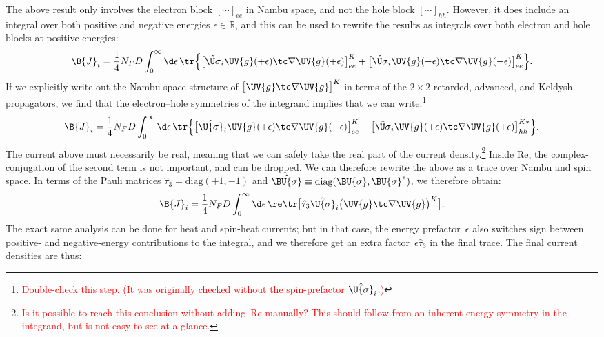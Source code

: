 The above result only involves the electron block $[\cdots]_{ee}$ in Nambu space, and not the hole block $[\cdots]_{hh}$.
However, it does include an integral over both positive and negative energies $\epsilon \in \mathbb{R}$, and this can be used to rewrite the results as integrals over both electron and hole blocks at positive energies:
\begin{align}
  \B{J}_i = \frac{1}{4}N_FD \int_0^\infty \d\epsilon\, \tr \Big\{  \big[\hat{\U\sigma}_i \UV{g}(+\epsilon)\tc\nabla\UV{g}(+\epsilon) \big]^K_{ee} + \big[ \hat{\U\sigma}_i \UV{g}(-\epsilon)\tc\nabla\UV{g}(-\epsilon) \big]^K_{ee} \Big\}.
\end{align}
If we explicitly write out the Nambu-space structure of $\big[ \UV{g}\tc\nabla\UV{g} \big]^K$ in terms of the $2\times2$ retarded, advanced, and Keldysh propagators, we find that the electron--hole symmetries of the integrand implies that we can write:\footnote{\textcolor{red}{Double-check this step. (It was originally checked without the spin-prefactor $\hat{\U{\sigma}}_i$.)}}
\begin{align}
  \B{J}_i = \frac{1}{4}N_FD \int_0^\infty \d\epsilon\, \tr \Big\{ \big[ \hat{\U{\sigma}}_i \UV{g}(+\epsilon)\tc\nabla\UV{g}(+\epsilon) \big]^K_{ee} - \big[ \hat{\U\sigma}_i \UV{g}(+\epsilon)\tc\nabla\UV{g}(+\epsilon) \big]^{K\ast}_{hh} \Big\}.
\end{align}
The current above must necessarily be real, meaning that we can safely take the real part of the current density.\footnote{\textcolor{red}{Is it possible to reach this conclusion without adding~Re manually? This should follow from an inherent energy-symmetry in the integrand, but is not easy to see at a glance.}}
Inside Re, the complex-conjugation of the second term is not important, and can be dropped.
We can therefore rewrite the above as a trace over Nambu and spin space.
In terms of the Pauli matrices $\hat{\tau}_3 = \text{diag}(+1,-1)$ and $\hat{\BU{\sigma}} \equiv \text{diag}(\BU{\sigma},\BU{\sigma}^*)$, we therefore obtain:
\begin{align}
  \B{J}_i = \frac{1}{4}N_FD \int_0^\infty \d\epsilon\, \re\tr \big[ \hat{\tau}_3 \hat{\U{\sigma}}_i  \big( \UV{g}\tc\nabla\UV{g} \big)^K \big].
\end{align}
The exact same analysis can be done for heat and spin-heat currents; but in that case, the energy prefactor~$\epsilon$ also switches sign between positive- and negative-energy contributions to the integral, and we therefore get an extra factor~$\epsilon\hat{\tau}_3$ in the final trace.
The final current densities are thus:
